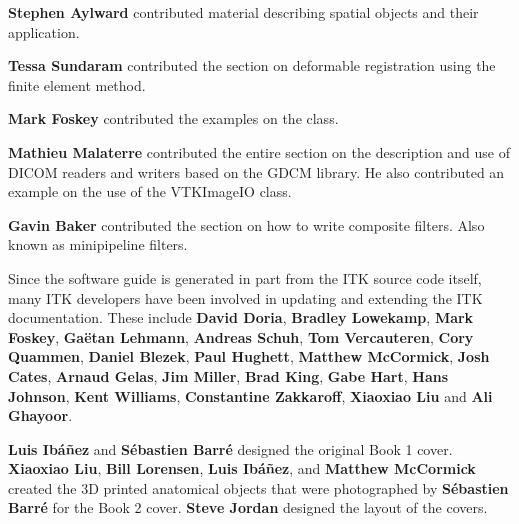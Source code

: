 {\bf Stephen Aylward} contributed material describing spatial objects and
their application.

{\bf Tessa Sundaram} contributed the section on deformable registration using
the finite element method.

{\bf Mark Foskey} contributed the examples on the
  class.

{\bf Mathieu Malaterre} contributed the entire section on the description and
use of DICOM readers and writers based on the GDCM library. He also contributed
an example on the use of the VTKImageIO class.

{\bf Gavin Baker} contributed the section on how to write composite filters.
Also known as minipipeline filters.

Since the software guide is generated in part from the ITK source code
itself, many ITK developers have been involved in updating and
extending the ITK documentation.  These include {\bf David Doria},
{\bf Bradley Lowekamp}, {\bf Mark Foskey}, {\bf Ga\"{e}tan Lehmann},
{\bf Andreas Schuh}, {\bf Tom Vercauteren}, {\bf Cory Quammen}, {\bf Daniel Blezek},
{\bf Paul Hughett}, {\bf Matthew McCormick}, {\bf Josh Cates}, {\bf Arnaud Gelas},
{\bf Jim Miller}, {\bf Brad King}, {\bf Gabe Hart}, {\bf Hans Johnson}, {\bf Kent Williams},
{\bf Constantine Zakkaroff}, {\bf Xiaoxiao Liu} and {\bf Ali Ghayoor}. 

{\bf Luis Ib\'{a}\~{n}ez} and {\bf S\'{e}bastien Barr\'{e}} designed the
original Book 1 cover. {\bf Xiaoxiao Liu}, {\bf Bill Lorensen}, 
{\bf Luis Ib\'{a}\~{n}ez}, and {\bf Matthew McCormick} created the 3D printed anatomical 
objects that were photographed by {\bf S\'{e}bastien Barr\'{e}} for the Book 2 cover. 
{\bf Steve Jordan} designed the layout of the covers.
